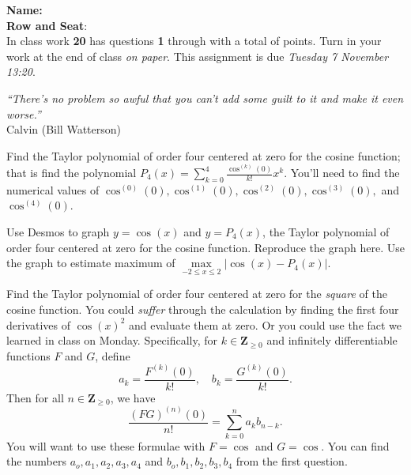 \documentclass[12pt,fleqn]{exam}
\newcommand{\integers}{\mathbf{Z}}
\newcommand{\quiz}{20}
\newcommand{\due}{Tuesday 7 November 13:20}
\newcommand{\class}{MATH 202, Fall \the\year}
\begin{document}
\large
\noindent\makebox[3.0truein][l]{\textbf{\class}}
\textbf{Name:} \hrulefill \\
\noindent \makebox[3.0truein][l]{\textbf{In class work  \quiz}}
\textbf{Row and Seat}:\hrulefill\\



\noindent  In class work  \textbf{\quiz}  has questions \textbf{1} 
through  \textbf{\numquestions} \/ with a total of 
\textbf{\numpoints\/} points. Turn in your work at the end of class 
\emph{on paper}. This assignment is due \emph{\due}.

\vspace{0.1in}
\noindent \emph{“There’s no problem so awful that you can’t add some guilt to it and make it even worse.”} \\ \phantom{xxx} \hfill {\sc Calvin (Bill Watterson)}


\begin{questions} 

\question[2] Find the Taylor polynomial of order four centered at zero for the cosine function; that is find the polynomial
$\displaystyle
   P_4(x) = \sum_{k=0}^4 \frac{\cos^{(k)}(0)}{k!} x^k.
$
You'll need to find the numerical values of $\cos^{(0)}(0), \cos^{(1)}(0),  \cos^{(2)}(0),  \cos^{(3)}(0),$ and $ \cos^{(4)}(0)$.
\begin{solution}[3.5in]

\end{solution}

\question[2] Use Desmos to graph $y = \cos(x)$ and $y = P_4(x)$, the Taylor polynomial of order four centered at zero for the cosine function.
Reproduce the graph here.  Use the graph to estimate  
maximum of $ \underset{-2 \leq x \leq 2}{\max}| \cos(x) - P_4(x)|$.

\begin{solution}%

\end{solution}

\newpage

\question[2] Find the Taylor polynomial of order four centered at zero for the \emph{square} of the cosine function.  You could \emph{suffer}
through the calculation by finding the first four derivatives of $\cos(x)^2$ and evaluate them at zero. Or you could use the fact we learned
in class on Monday. Specifically, for $k \in \integers_{\geq 0}$ and infinitely differentiable functions $F$ and $G$, define
\begin{equation*}
   a_k = \frac{F^{(k)}(0)}{k!}, \quad 
   b_k = \frac{G^{(k)}(0)}{k!}.
\end{equation*}
Then for all $n \in \integers_{\geq 0}$, we have
\begin{equation*}
   \frac{ \left(F G\right)^{(n)}(0)}{n!} = \sum_{k=0}^n  a_k b_{n-k}.
\end{equation*}
You will want to use these formulae with $F = \cos$ and $G = \cos$.  You can find the numbers $a_o, a_1, a_2, a_3, a_4$ 
and $b_o, b_1, b_2, b_3, b_4$ from the 
first question. 




\end{questions}
\end{document}
